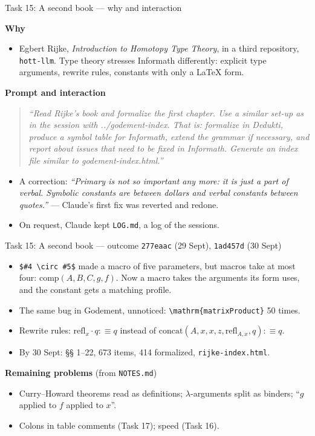 \documentclass[10pt,aspectratio=169]{beamer}
\newcommand{\bad}[1]{\textcolor{warn}{#1}}
\newcommand{\ok}[1]{\textcolor{good}{#1}}
\newcommand{\commit}[1]{\texttt{\footnotesize #1}}
\newcommand{\prompt}[1]{\begin{quote}\small\itshape ``#1''\end{quote}}
\newcommand{\why}{\par\textcolor{gfblue}{\textbf{Why}}\par}
\newcommand{\how}{\par\textcolor{gfblue}{\textbf{Prompt and interaction}}\par}
\begin{document}
\begin{frame}{Task 15: A second book --- why and interaction}
  \why
  \begin{itemize}\small
    \item Egbert Rijke, \emph{Introduction to Homotopy Type Theory}, in a third
          repository, \texttt{hott-llm}. Type theory stresses Informath differently:
          explicit type arguments, rewrite rules, constants with only a LaTeX form.
  \end{itemize}
  \how
  \prompt{Read Rijke's book and formalize the first chapter. Use a similar set-up as
    in the session with ../godement-index. That is: formalize in Dedukti, produce a
    symbol table for Informath, extend the grammar if necessary, and report about
    issues that need to be fixed in Informath. Generate an index file similar to
    godement-index.html.}
  \begin{itemize}\small
    \item A correction: \emph{``Primary is not so important any more: it is just a part
          of verbal. Symbolic constants are between dollars and verbal constants
          between quotes.''} --- Claude's first fix was reverted and redone.
    \item On request, Claude kept \texttt{LOG.md}, a log of the sessions.
  \end{itemize}
\end{frame}

\begin{frame}{Task 15: A second book --- outcome}
  \commit{277eaac} (29 Sept), \commit{1ad457d} (30 Sept)
  \begin{itemize}\small
    \item \texttt{\$\#4 \textbackslash circ \#5\$} made a macro of five parameters, but
          macros take at most four: \bad{$\mathrm{comp}(A, B, C, g, f)$}. Now a macro
          takes the arguments its form uses, and the constant gets a matching profile.
    \item The same bug in Godement, unnoticed: \bad{\texttt{\textbackslash mathrm\{matrixProduct\}}}
          50 times.
    \item Rewrite rules: \ok{$\mathrm{refl}_x \cdot q :\equiv q$} instead of
          \bad{$\mathrm{concat}(A, x, x, z, \mathrm{refl}_{A,x}, q) :\equiv q$}.
    \item By 30 Sept: §§ 1--22, 673 items, 414 formalized, \texttt{rijke-index.html}.
  \end{itemize}
  \textbf{Remaining problems} (from \texttt{NOTES.md})
  \begin{itemize}\small
    \item Curry--Howard theorems read as definitions; $\lambda$-arguments split as
          binders; ``$g$ applied to $f$ applied to $x$''.
    \item Colons in table comments (Task 17); speed (Task 16).
  \end{itemize}
\end{frame}
\end{document}
